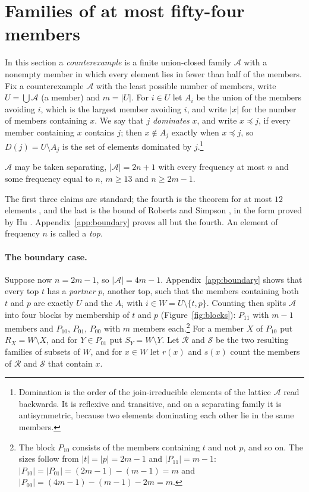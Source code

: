 \documentclass[12pt]{article}
\theoremstyle{plain}
\newcommand{\cA}{\mathcal{A}}
\begin{document}
\section{Families of at most fifty-four members}\label{sec:small}

In this section a \emph{counterexample} is a finite union-closed family $\cA$ with a nonempty member in which every element lies in fewer than half of the members. Fix a counterexample $\cA$ with the least possible number of members, write $U=\bigcup\cA$ (a member) and $m=|U|$. For $i\in U$ let $A_i$ be the union of the members avoiding $i$, which is the largest member avoiding $i$, and write $|x|$ for the number of members containing $x$. We say that $j$ \emph{dominates} $x$, and write $x\preceq j$, if every member containing $x$ contains $j$; then $x\notin A_j$ exactly when $x\preceq j$, so $D(j)=U\setminus A_j$ is the set of elements dominated by $j$.\footnote{Domination is the order of the join-irreducible elements of the lattice $\cA$ read backwards. It is reflexive and transitive, and on a separating family it is antisymmetric, because two elements dominating each other lie in the same members.}

\begin{lemma}\label{lem:smallest}
$\cA$ may be taken separating, $|\cA|=2n+1$ with every frequency at most $n$ and some frequency equal to $n$, $m\ge 13$ and $n\ge 2m-1$.
\end{lemma}

The first three claims are standard; the fourth is the theorem for at most $12$ elements \cite{VZ17}, and the last is the bound of Roberts and Simpson \cite{RS10}, in the form proved by Hu \cite{Hu17}. Appendix~\ref{app:boundary} proves all but the fourth. An element of frequency $n$ is called a \emph{top}.

\paragraph*{The boundary case.} Suppose now $n=2m-1$, so $|\cA|=4m-1$. Appendix~\ref{app:boundary} shows that every top $t$ has a \emph{partner} $p$, another top, such that the members containing both $t$ and $p$ are exactly $U$ and the $A_i$ with $i\in W=U\setminus\{t,p\}$. Counting then splits $\cA$ into four blocks by membership of $t$ and $p$ (Figure~\ref{fig:blocks}): $P_{11}$ with $m-1$ members and $P_{10}$, $P_{01}$, $P_{00}$ with $m$ members each.\footnote{The block $P_{10}$ consists of the members containing $t$ and not $p$, and so on. The sizes follow from $|t|=|p|=2m-1$ and $|P_{11}|=m-1$: $|P_{10}|=|P_{01}|=(2m-1)-(m-1)=m$ and $|P_{00}|=(4m-1)-(m-1)-2m=m$.} For a member $X$ of $P_{10}$ put $R_X=W\setminus X$, and for $Y\in P_{01}$ put $S_Y=W\setminus Y$. Let $\mathcal R$ and $\mathcal S$ be the two resulting families of subsets of $W$, and for $x\in W$ let $r(x)$ and $s(x)$ count the members of $\mathcal R$ and $\mathcal S$ that contain $x$.
\end{document}
